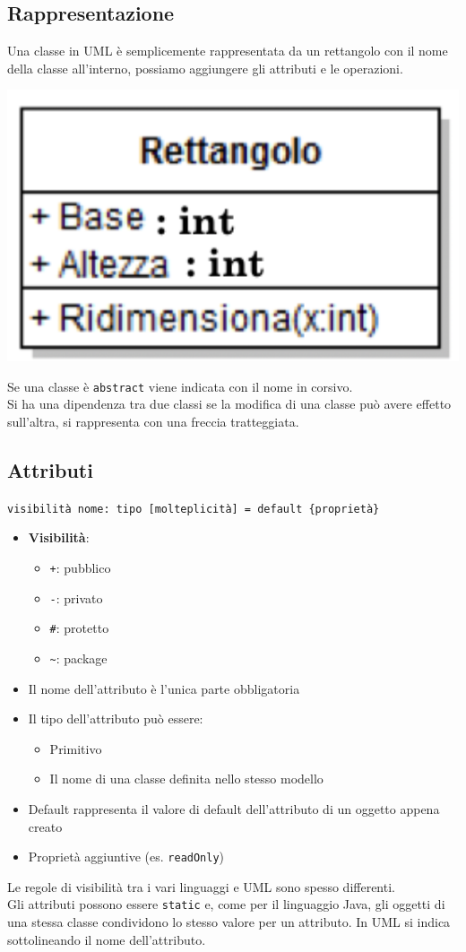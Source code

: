 \documentclass[12pt, a4paper]{report}
\begin{document}
\subsection{Rappresentazione}
Una classe in UML è semplicemente rappresentata da un rettangolo con il nome della classe all'interno, possiamo aggiungere gli attributi e le operazioni.
\begin{center}
    \includegraphics[width=.3\textwidth]{Immagini/UMLClass.png}
\end{center}
Se una classe è \texttt{abstract} viene indicata con il nome in corsivo.\\
Si ha una dipendenza tra due classi se la modifica di una classe può avere effetto sull'altra, si rappresenta con una freccia tratteggiata.
\subsection{Attributi}
\begin{center}
    \texttt{visibilità nome: tipo [molteplicità] = default \{proprietà\}}
\end{center}
\begin{itemize}
    \item \textbf{Visibilità}: \begin{itemize}
        \item \texttt{+}: pubblico
        \item \texttt{-}: privato
        \item \texttt{\#}: protetto
        \item \texttt{\~}: package
    \end{itemize}
    \item Il nome dell'attributo è l'unica parte obbligatoria
    \item Il tipo dell'attributo può essere: \begin{itemize}
        \item Primitivo
        \item Il nome di una classe definita nello stesso modello
    \end{itemize}
    \item Default rappresenta il valore di default dell'attributo di un oggetto appena creato
    \item Proprietà aggiuntive (es. \texttt{readOnly})
\end{itemize}
Le regole di visibilità tra i vari linguaggi e UML sono spesso differenti.\\
Gli attributi possono essere \texttt{static} e, come per il linguaggio Java, gli oggetti di una stessa classe condividono lo stesso valore per un attributo. In UML si indica sottolineando il nome dell'attributo.
\end{document}
